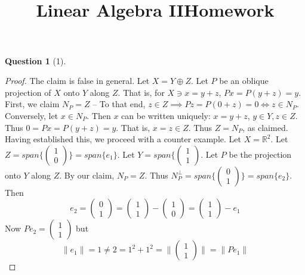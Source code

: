 \documentclass[11pt]{article}
\title{\vspace{-50pt}
\Huge \name
\\\vspace{20pt}
\huge Linear Algebra II\hfill Homework \hw}
\author{}
\date{}
\theoremstyle{quest}
\newtheorem*{question}{Question}
\begin{document}
\maketitle

\begin{question}[1]
\end{question}
\begin{proof}
The claim is false in general. Let $X = Y \oplus Z$. Let $P$ be an oblique projection of $X$ onto $Y$ along $Z$. That is, for $X \ni x = y + z$, $Px = P(y+z) = y$. First, we claim $N_P = Z$ -- To that end, $z \in Z \implies Pz = P(0 + z) = 0 \iff z \in N_P$. Conversely, let $x \in N_P$. Then $x$ can be written uniquely: $x = y + z$, $y \in Y, z \in Z$. Thus $0 = Px = P(y+z) = y$. That is, $x = z \in Z$. Thus $Z = N_P$, as claimed. Having established this, we proceed with a counter example. Let $X = \mathbb{R}^2$. Let $Z = span\{\begin{pmatrix}
1 \\
0
\end{pmatrix} \} = span\{e_1\}$. Let $Y = span\{\begin{pmatrix}
1 \\
1
\end{pmatrix}$. Let $P$ be the projection onto $Y$ along $Z$. By our claim, $N_P = Z$. Thus $N_P^{\perp} = span\{\begin{pmatrix}
0 \\
1
\end{pmatrix}\} = span\{e_2\}$. Then
$$e_2 = \begin{pmatrix}
0 \\
1
\end{pmatrix} = \begin{pmatrix}
1 \\
1
\end{pmatrix} - \begin{pmatrix}
1 \\
0
\end{pmatrix} = \begin{pmatrix}
1 \\
1
\end{pmatrix} - e_1$$
Now $Pe_2 = \begin{pmatrix}
1 \\
1
\end{pmatrix}$ but
$$\|e_1\| = 1 \ne 2 = 1^2 + 1^2 = \|\begin{pmatrix}
1 \\
1
\end{pmatrix}\| = \|Pe_1\|$$
\end{proof}
\end{document}
